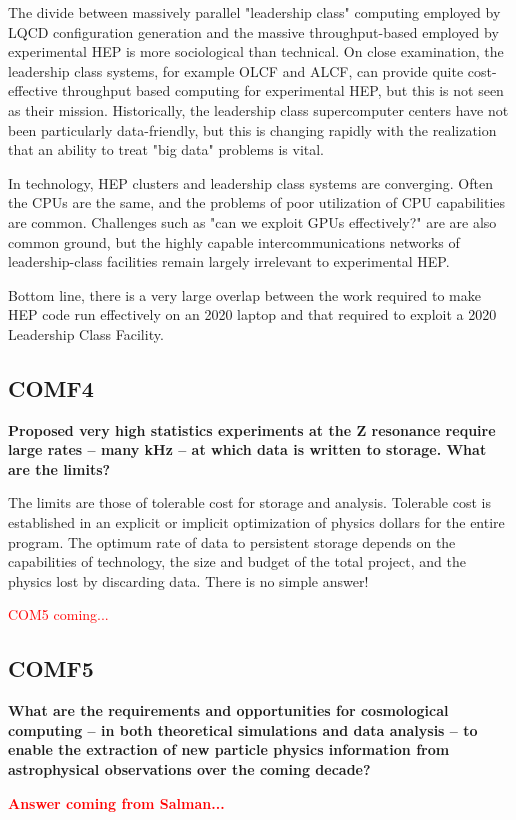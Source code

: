 The divide between massively parallel "leadership class" computing
employed by LQCD configuration generation and the massive throughput-based
employed by experimental HEP is more sociological than technical.  On
close examination, the leadership class systems, for example OLCF and
ALCF, can provide quite cost-effective throughput based computing for
experimental HEP, but this is not seen as their mission.  Historically,
the leadership class supercomputer centers have not been particularly
data-friendly, but this is changing rapidly with the realization that an
ability to treat "big data" problems is vital.

In technology, HEP clusters and leadership class systems are converging.
Often the CPUs are the same, and the problems of poor utilization of CPU
capabilities are common. Challenges such as "can we exploit GPUs
effectively?" are are also common ground, but the highly capable
intercommunications networks of leadership-class facilities remain largely
irrelevant to experimental HEP.

Bottom line, there is a very large overlap between the work required to
make HEP code run effectively on an 2020 laptop and that required to
exploit a 2020 Leadership Class Facility.


\subsection{COMF4}

{\bf
 Proposed very high statistics experiments at the Z resonance require large rates --
many kHz -- at which data is written to storage. What are the limits?}


The limits are those of tolerable cost for storage and analysis.
Tolerable cost is established in an explicit or implicit optimization of
physics dollars for the entire program.  The optimum rate of data to persistent
storage depends on the capabilities of technology, the size and budget of
the total project, and the physics lost by discarding data. There is no
simple answer!

\textcolor{red} {COM5 coming...}
\subsection{COMF5}
 
 {\bf
 What are the requirements and opportunities for cosmological computing -- in both
theoretical simulations and data analysis -- to enable the extraction of new particle
physics information from astrophysical observations over the coming decade?}

\textcolor{red}{
{\bf Answer coming from Salman...}}







